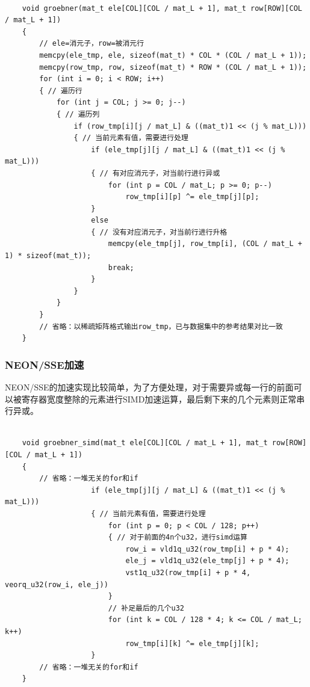 \documentclass[a4paper]{article}
\begin{document}
\begin{verbatim}

    void groebner(mat_t ele[COL][COL / mat_L + 1], mat_t row[ROW][COL / mat_L + 1])
    {
        // ele=消元子，row=被消元行
        memcpy(ele_tmp, ele, sizeof(mat_t) * COL * (COL / mat_L + 1));
        memcpy(row_tmp, row, sizeof(mat_t) * ROW * (COL / mat_L + 1));
        for (int i = 0; i < ROW; i++)
        { // 遍历行
            for (int j = COL; j >= 0; j--)
            { // 遍历列
                if (row_tmp[i][j / mat_L] & ((mat_t)1 << (j % mat_L)))
                { // 当前元素有值，需要进行处理
                    if (ele_tmp[j][j / mat_L] & ((mat_t)1 << (j % mat_L)))
                    { // 有对应消元子，对当前行进行异或
                        for (int p = COL / mat_L; p >= 0; p--)
                            row_tmp[i][p] ^= ele_tmp[j][p];
                    }
                    else
                    { // 没有对应消元子，对当前行进行升格
                        memcpy(ele_tmp[j], row_tmp[i], (COL / mat_L + 1) * sizeof(mat_t));
                        break;
                    }
                }
            }
        }
        // 省略：以稀疏矩阵格式输出row_tmp，已与数据集中的参考结果对比一致
    }
\end{verbatim}

\subsubsection{NEON/SSE加速}
NEON/SSE的加速实现比较简单，为了方便处理，对于需要异或每一行的前面可以被寄存器宽度整除的元素进行SIMD加速运算，最后剩下来的几个元素则正常串行异或。

\begin{verbatim}

    void groebner_simd(mat_t ele[COL][COL / mat_L + 1], mat_t row[ROW][COL / mat_L + 1])
    {
        // 省略：一堆无关的for和if
                    if (ele_tmp[j][j / mat_L] & ((mat_t)1 << (j % mat_L)))
                    { // 当前元素有值，需要进行处理
                        for (int p = 0; p < COL / 128; p++)
                        { // 对于前面的4n个u32，进行simd运算
                            row_i = vld1q_u32(row_tmp[i] + p * 4);
                            ele_j = vld1q_u32(ele_tmp[j] + p * 4);
                            vst1q_u32(row_tmp[i] + p * 4, veorq_u32(row_i, ele_j))
                        }
                        // 补足最后的几个u32
                        for (int k = COL / 128 * 4; k <= COL / mat_L; k++)
                            row_tmp[i][k] ^= ele_tmp[j][k]; 
                    }
        // 省略：一堆无关的for和if
    }
\end{verbatim}
\end{document}

